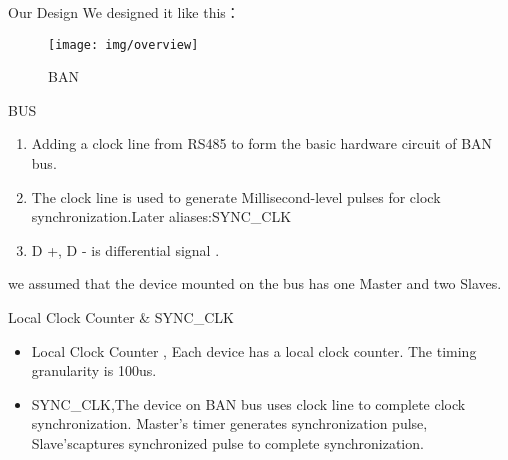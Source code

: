 \begin{frame}[fragile]{Our Design}
We designed it like this：
\begin{figure}[htbp]
\begin{center}
\texttt{[image: img/overview]}
\caption{BAN }
\label{Overview}
\end{center}
\vspace{-0.5em}
\end{figure}
\end{frame}





\begin{frame}[fragile]{BUS}

\begin{enumerate}
\item Adding a clock line from RS485 to form the basic hardware circuit of BAN bus.
\item The clock  line is used to generate Millisecond-level pulses for clock synchronization.Later aliases:SYNC\_CLK
\item D +, D - is  differential  signal  .

\end{enumerate}

we assumed that the device mounted on the bus has one Master and two Slaves.


\end{frame}

\begin{frame}[fragile]{Local Clock Counter \& SYNC\_CLK}

\begin{itemize}
\item  Local Clock Counter , Each device has a local clock counter. The timing granularity is 100us.

\item  SYNC\_CLK,The device on BAN bus uses clock line to complete clock synchronization. Master's timer generates synchronization pulse, Slave'scaptures synchronized  pulse to complete synchronization.
\end{itemize}


\end{frame}





